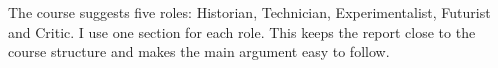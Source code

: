The course suggests five roles: Historian, Technician, Experimentalist,
Futurist and Critic. I use one section for each role. This keeps the report
close to the course structure and makes the main argument easy to follow.

